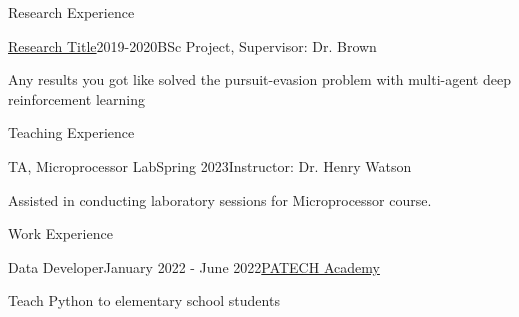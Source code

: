 \documentclass{resume} %
\begin{document}
    \begin{rSection}{Research Experience}
        \begin{rSubsection}{\href{https://link_to_your_research.com}{\textcolor{coolblack}{Research Title}}}{2019-2020}{BSc Project, Supervisor: Dr. Brown}{ }
            \item Any results you got like solved the pursuit-evasion problem with multi-agent deep reinforcement learning
        \end{rSubsection}
    \end{rSection}

\begin{rSection}{Teaching Experience}
	\begin{rSubsection}{TA, Microprocessor Lab}{Spring 2023}{Instructor: Dr. Henry Watson}{}
		\item Assisted in conducting laboratory sessions for Microprocessor course.
	\end{rSubsection}
\end{rSection}

    \begin{rSection}{Work Experience}
        \begin{rSubsection}{Data Developer}{January 2022 - June 2022}{\href{https://patech.ir}{\textcolor{coolblack}{PATECH Academy}}}{ }
            \item Teach Python to elementary school students
        \end{rSubsection}
    \end{rSection}
\end{document}
